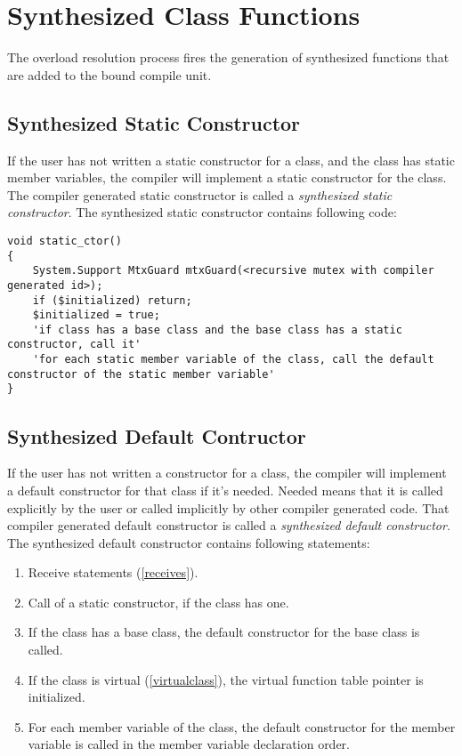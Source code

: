 \documentclass[a4paper,oneside,11pt]{book}
\theoremstyle{definition}
\begin{document}
\section{Synthesized Class Functions}

The overload resolution process fires the generation of synthesized functions that are added to the bound compile unit.

\subsection{Synthesized Static Constructor}

If the user has not written a static constructor for a class, and the class has static member variables, the compiler will implement a
static constructor for the class.
The compiler generated static constructor is called a \emph{synthesized static constructor}.
The synthesized static constructor contains following code:
\lstset{language=Cmajor}
\begin{lstlisting}[frame=trBL]
void static_ctor()
{
    System.Support MtxGuard mtxGuard(<recursive mutex with compiler generated id>);
    if ($initialized) return;
    $initialized = true;
    'if class has a base class and the base class has a static constructor, call it'
    'for each static member variable of the class, call the default constructor of the static member variable'
}
\end{lstlisting}

\subsection{Synthesized Default Contructor}

If the user has not written a constructor for a class, the compiler will implement a default constructor for that class if it's needed.
Needed means that it is called explicitly by the user or called implicitly by other compiler generated code.
That compiler generated default constructor is called a \emph{synthesized default constructor}.
The synthesized default constructor contains following statements:
\begin{enumerate}
\item
Receive statements (\ref{receives}).
\item
Call of a static constructor, if the class has one.
\item
If the class has a base class, the default constructor for the base class is called.
\item
If the class is virtual (\ref{virtualclass}), the virtual function table pointer is initialized.
\item
For each member variable of the class, the default constructor for the member variable is called in the member variable declaration order.
\end{enumerate}
\end{document}
